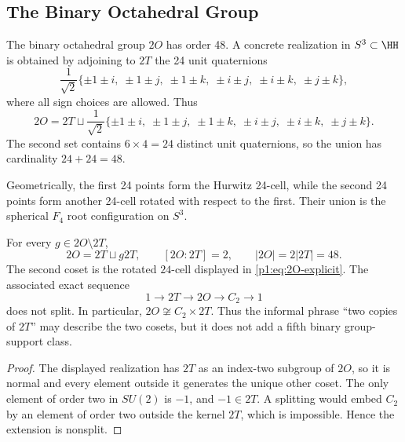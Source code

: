 \documentclass[11pt]{article}
\begin{document}
\subsection{The Binary Octahedral Group}

The binary octahedral group $2O$ has order 48. A concrete realization in
$S^3 \subset \HH$ is obtained by adjoining to $2T$ the 24 unit quaternions
\begin{equation}
\label{p1:eq:2O-explicit}
\frac{1}{\sqrt{2}}\{\pm 1 \pm i,\; \pm 1 \pm j,\; \pm 1 \pm k,\; \pm i \pm j,\; \pm i \pm k,\; \pm j \pm k\},
\end{equation}
where all sign choices are allowed. Thus
\begin{equation}
\label{p1:eq:2O-decomposition}
2O = 2T \sqcup \frac{1}{\sqrt{2}}\{\pm 1 \pm i,\; \pm 1 \pm j,\; \pm 1 \pm k,\; \pm i \pm j,\; \pm i \pm k,\; \pm j \pm k\}.
\end{equation}
The second set contains $6 \times 4 = 24$ distinct unit quaternions, so the
union has cardinality $24+24=48$.
\cite{conwaysmith2003quaternions,coxeter1973regular}

Geometrically, the first 24 points form the Hurwitz 24-cell, while the second
24 points form another 24-cell rotated with respect to the first. Their union
is the spherical $F_4$ root configuration on $S^3$.
\cite{coxeter1973regular,conwaySloane1999sphere}

\begin{proposition}
\label{p1:prop:2O-two-cosets-not-product}
For every \(g\in2O\setminus2T\),
\[
  2O=2T\sqcup g2T,
  \qquad [2O:2T]=2,
  \qquad |2O|=2|2T|=48.
\]
The second coset is the rotated \(24\)-cell displayed in
\eqref{p1:eq:2O-explicit}.  The associated exact sequence
\[
  1\longrightarrow2T\longrightarrow2O\longrightarrow C_2
  \longrightarrow1
\]
does not split.  In particular, \(2O\not\cong C_2\times2T\).
Thus the informal phrase ``two copies of \(2T\)'' may describe the two
cosets, but it does not add a fifth binary group-support class.
\end{proposition}

\begin{proof}
The displayed realization has \(2T\) as an index-two subgroup of \(2O\), so
it is normal and every element outside it generates the unique other coset.
The only element of order two in \(SU(2)\) is \(-1\), and \(-1\in2T\).
A splitting would embed \(C_2\) by an element of order two outside the
kernel \(2T\), which is impossible.  Hence the extension is nonsplit.
\end{proof}
\end{document}
